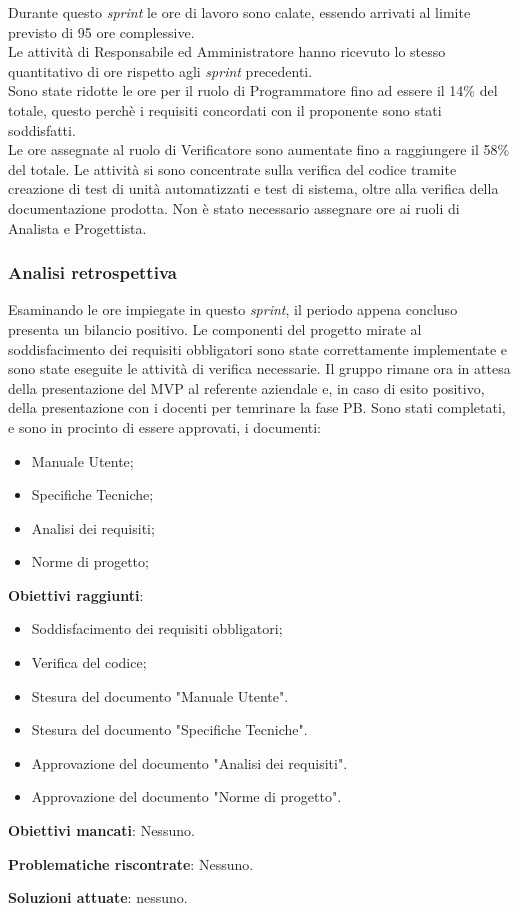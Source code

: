 Durante questo \textit{sprint} le ore di lavoro sono calate, essendo arrivati al limite previsto di 95 ore complessive.\\
Le attività di Responsabile ed Amministratore hanno ricevuto lo stesso quantitativo di ore rispetto agli \textit{sprint} precedenti.\\
Sono state ridotte le ore per il ruolo di Programmatore fino ad essere il 14\% del totale, questo perchè i requisiti concordati con il proponente sono stati soddisfatti.\\
Le ore assegnate al ruolo di Verificatore sono aumentate fino a raggiungere il 58\% del totale.
Le attività si sono concentrate sulla verifica del codice tramite creazione di test di unità automatizzati e test di sistema, oltre alla verifica della documentazione prodotta.
Non è stato necessario assegnare ore ai ruoli di Analista e Progettista.

\subsubsection{Analisi retrospettiva}
Esaminando le ore impiegate in questo \textit{sprint}, il periodo appena concluso presenta un bilancio positivo.
Le componenti del progetto mirate al soddisfacimento dei requisiti obbligatori sono state correttamente implementate e sono state eseguite le attività di verifica necessarie.
Il gruppo rimane ora in attesa della presentazione del MVP al referente aziendale e, in caso di esito positivo, della presentazione con i docenti per temrinare la fase PB.
Sono stati completati, e sono in procinto di essere approvati, i documenti:
\begin{itemize}
	\item Manuale Utente;
	\item Specifiche Tecniche;
	\item Analisi dei requisiti;
	\item Norme di progetto;
\end{itemize}


\textbf{Obiettivi raggiunti}:
\begin{itemize}
	\item Soddisfacimento dei requisiti obbligatori;
	\item Verifica del codice;
	\item Stesura del documento "Manuale Utente".
	\item Stesura del documento "Specifiche Tecniche".
	\item Approvazione del documento "Analisi dei requisiti".
	\item Approvazione del documento "Norme di progetto".
\end{itemize}


\textbf{Obiettivi mancati}: Nessuno.

\textbf{Problematiche riscontrate}: Nessuno.

\textbf{Soluzioni attuate}: nessuno.